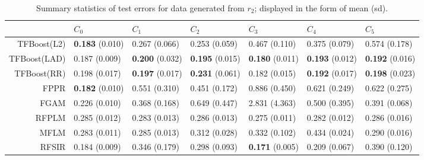 \begin{table}[H]
\centering
\footnotesize
\begin{tabular}{rllllll}
  \hline
 & $C_0$ & $C_1$ & $C_2$ & $C_3$ & $C_4$ & $C_5$ \\ 
  \hline
TFBoost(L2) & \textbf{0.183} (0.010) & 0.267 (0.066) & 0.253 (0.059) & 0.467 (0.110) & 0.375 (0.079) & 0.574 (0.178) \\ 
  TFBoost(LAD) & 0.187 (0.009) & \textbf{0.200} (0.032) & \textbf{0.195} (0.015) & \textbf{0.180} (0.011) & \textbf{0.193} (0.012) & \textbf{0.192} (0.016) \\ 
  TFBoost(RR) & 0.198 (0.017) & \textbf{0.197} (0.017) & \textbf{0.231} (0.061) & 0.182 (0.015) & \textbf{0.192} (0.017) & \textbf{0.198} (0.023) \\ 
  FPPR & \textbf{0.182} (0.010) & 0.551 (0.310) & 0.451 (0.172) & 0.886 (0.450) & 0.621 (0.249) & 0.622 (0.275) \\ 
  FGAM & 0.226 (0.010) & 0.368 (0.168) & 0.649 (0.447) & 2.831 (4.363) & 0.500 (0.395) & 0.391 (0.068) \\ 
  RFPLM & 0.285 (0.012) & 0.283 (0.013) & 0.286 (0.013) & 0.275 (0.011) & 0.282 (0.012) & 0.286 (0.016) \\ 
  MFLM & 0.283 (0.011) & 0.285 (0.013) & 0.312 (0.028) & 0.332 (0.102) & 0.434 (0.024) & 0.290 (0.016) \\ 
  RFSIR & 0.184 (0.009) & 0.346 (0.179) & 0.298 (0.093) & \textbf{0.171} (0.005) & 0.209 (0.067) & 0.390 (0.120) \\ 
   \hline
\end{tabular}
\caption{Summary statistics of test errors for data generated from $r_2$; displayed in the form of mean (sd).} 
\end{table}
